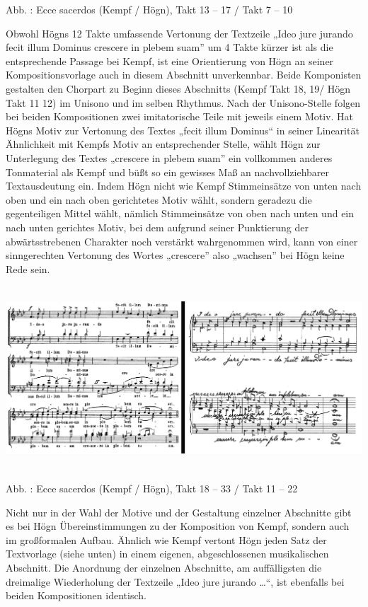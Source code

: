 Abb. : Ecce sacerdos (Kempf / Högn), Takt 13 –
17 / Takt 7 – 10

Obwohl Högns 12 Takte umfassende Vertonung der Textzeile „Ideo jure
jurando fecit illum Dominus crescere in plebem suam” um 4 Takte kürzer
ist als die entsprechende Passage bei Kempf, ist eine Orientierung von
Högn an seiner Kompositionsvorlage auch in diesem Abschnitt
unverkennbar. Beide Komponisten gestalten den Chorpart zu Beginn dieses
Abschnitts (Kempf Takt 18, 19/ Högn Takt 11 12) im Unisono und im
selben Rhythmus. Nach der Unisono-Stelle folgen bei beiden
Kompositionen zwei imitatorische Teile mit jeweils einem Motiv. Hat
Högns Motiv zur Vertonung des Textes „fecit illum Dominus“ in seiner
Linearität Ähnlichkeit mit Kempfs Motiv an entsprechender Stelle, wählt
Högn zur Unterlegung des Textes „crescere in plebem suam” ein
vollkommen anderes Tonmaterial als Kempf und büßt so ein gewisses Maß
an nachvollziehbarer Textausdeutung ein. Indem Högn nicht wie Kempf
Stimmeinsätze von unten nach oben und ein nach oben gerichtetes Motiv
wählt, sondern geradezu die gegenteiligen Mittel wählt, nämlich
Stimmeinsätze von oben nach unten und ein nach unten gerichtes Motiv,
bei dem aufgrund seiner Punktierung der abwärtsstrebenen Charakter noch
verstärkt wahrgenommen wird, kann von einer sinngerechten Vertonung des
Wortes „crescere” also „wachsen” bei Högn keine Rede sein.


\includegraphics[width=15.967cm,height=6.828cm]{pictures/zulassungsarbeit-img087.png}


Abb. : Ecce sacerdos (Kempf / Högn), Takt 18 –
 33 / Takt 11 –  22

Nicht nur in der Wahl der Motive und der Gestaltung einzelner Abschnitte
gibt es bei Högn Übereinstimmungen zu der Komposition von Kempf,
sondern auch im großformalen Aufbau. Ähnlich wie Kempf vertont Högn
jeden Satz der Textvorlage (siehe unten) in einem eigenen,
abgeschlossenen musikalischen Abschnitt. Die Anordnung der einzelnen
Abschnitte, am auffälligsten die dreimalige Wiederholung der Textzeile
„Ideo jure jurando …“, ist ebenfalls bei beiden Kompositionen
identisch.

